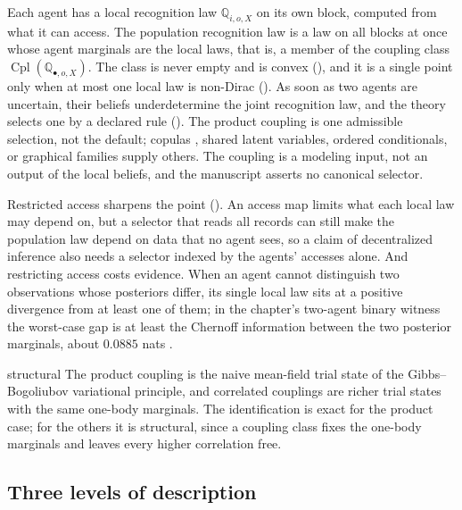 Each agent has a local recognition law $\mathbb Q_{i,o,X}$ on its own block, computed from what it can access.
The population recognition law is a law on all blocks at once whose agent marginals are the local laws, that
is, a member of the coupling class $\operatorname{Cpl}(\mathbb Q_{\bullet,o,X})$. The class is never empty and
is convex (), and it is a single point only when at most one local
law is non-Dirac (). As soon as two agents are uncertain, their
beliefs underdetermine the joint recognition law, and the theory selects one by a declared rule
(). The product coupling is one admissible selection, not the
default; copulas \citep{Nelsen2006}, shared latent variables, ordered conditionals, or graphical families
supply others. The coupling is a modeling input, not an output of the local beliefs, and the manuscript
asserts no canonical selector.

Restricted access sharpens the point (). An access map limits what each local
law may depend on, but a selector that reads all records can still make the population law depend on data that
no agent sees, so a claim of decentralized inference also needs a selector indexed by the agents' accesses
alone. And restricting access costs evidence. When an agent cannot distinguish two observations whose
posteriors differ, its single local law sits at a positive divergence from at least one of them; in the
chapter's two-agent binary witness the worst-case gap is at least the Chernoff information between the two
posterior marginals, about $0.0885$ nats \citep[Section~11.9]{CoverThomas2006}.

\begin{analogy}{structural}
The product coupling is the naive mean-field trial state of the Gibbs--Bogoliubov variational principle, and
correlated couplings are richer trial states with the same one-body marginals. The identification is exact for
the product case; for the others it is structural, since a coupling class fixes the one-body marginals and
leaves every higher correlation free.
\end{analogy}

\subsection{Three levels of description}

